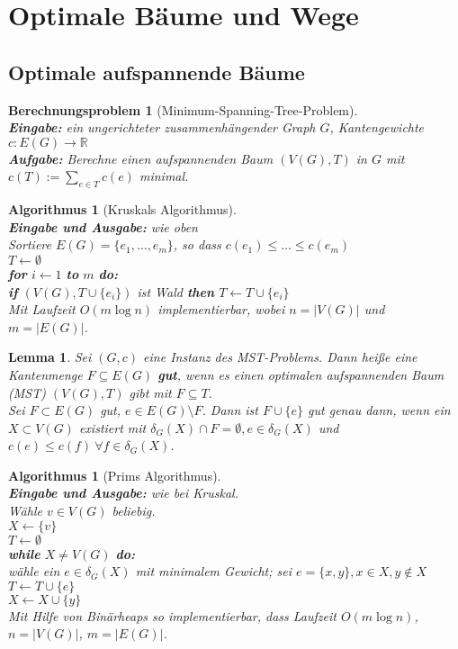 \documentclass[12pt,a4paper]{article}
\theoremstyle{plain}
\newtheorem{Lemma}[Theorem]{Lemma}
\newtheorem{Algorithmus}[Theorem]{Algorithmus}
\newtheorem{Berechnungsproblem}[Theorem]{Berechnungsproblem}
\newcommand{\herv}[1]{{\emph{\textbf{#1}}}}
\newcommand{\R}{\mathbb{R}}
\numberwithin{equation}{section}
\begin{document}
\section{Optimale Bäume und Wege}
\subsection{Optimale aufspannende Bäume}
\begin{Berechnungsproblem}[Minimum-Spanning-Tree-Problem]\\
\textbf{Eingabe:} ein ungerichteter zusammenhängender Graph $G$, Kantengewichte $c: E(G) \rightarrow \R$\\
\textbf{Aufgabe:} Berechne einen aufspannenden Baum $(V(G),T)$ in $G$ mit $c(T):=\sum_{e\in T} c(e)$ minimal.
\end{Berechnungsproblem}
\begin{Algorithmus}[Kruskals Algorithmus]\\
\textbf{Eingabe und Ausgabe:} wie oben\\
Sortiere $E(G)=\{e_1,\ldots,e_m\}$, so dass $c(e_1)\leq\ldots\leq c(e_m)$\\
$T\leftarrow \emptyset$\\
\textbf{for} $i\leftarrow 1$ \textbf{to} $m$ \textbf{do:}\\
\text{\qquad} \textbf{if} $(V(G), T\cup\{e_i\})$ ist Wald \textbf{then} $T\leftarrow T\cup\{e_i\}$\\
Mit Laufzeit $O(m \log n)$ implementierbar, wobei $n=|V(G)|$ und $m=|E(G)|$.
\end{Algorithmus}
\begin{Lemma}
Sei $(G,c)$ eine Instanz des MST-Problems. Dann heiße eine Kantenmenge $F\subseteq E(G)$ \herv{gut}, wenn es einen optimalen aufspannenden Baum (MST) $(V(G),T)$ gibt mit $F\subseteq T$.\\ Sei $F\subset E(G)$ gut, $e \in E(G)\setminus F$. Dann ist $F\cup \{e\}$ gut genau dann, wenn ein $X\subset V(G)$ existiert mit $\delta_G(X)\cap F=\emptyset, e\in \delta_G(X)$ und $c(e)\leq c(f)\ \forall f\in \delta_G(X)$.
\end{Lemma}
\begin{Algorithmus}[Prims Algorithmus]\\
\textbf{Eingabe und Ausgabe:} wie bei Kruskal.\\
Wähle $v\in V(G)$ beliebig.\\
$X\leftarrow \{v\}$ \\
$T\leftarrow \emptyset$\\
\textbf{while} $X\neq V(G)$ \textbf{do:}\\
\text{\qquad} wähle ein $e\in \delta_G(X)$ mit minimalem Gewicht; sei $e=\{x,y\}, x\in X, y\not\in X$\\
\text{\qquad} $T\leftarrow T\cup \{e\}$\\
\text{\qquad} $X\leftarrow X\cup \{y\}$ \\
Mit Hilfe von Binärheaps so implementierbar, dass Laufzeit $O(m \log n)$, $n=|V(G)|$, $m=|E(G)|$.
\end{Algorithmus}
\end{document}
